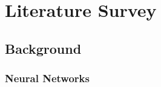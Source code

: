 \documentclass[12pt,twoside]{report}
\date{May 2019}
\begin{document}



\clearpage{\pagestyle{empty}\cleardoublepage}
\setcounter{page}{1}
\pagestyle{fancy}






\setcounter{page}{1}
\fancyhead[LE,RO]{\slshape \rightmark}
\fancyhead[LO,RE]{\slshape \leftmark}




\chapter{Literature Survey}

\section{Background}

\subsection{Neural Networks}
\end{document}

